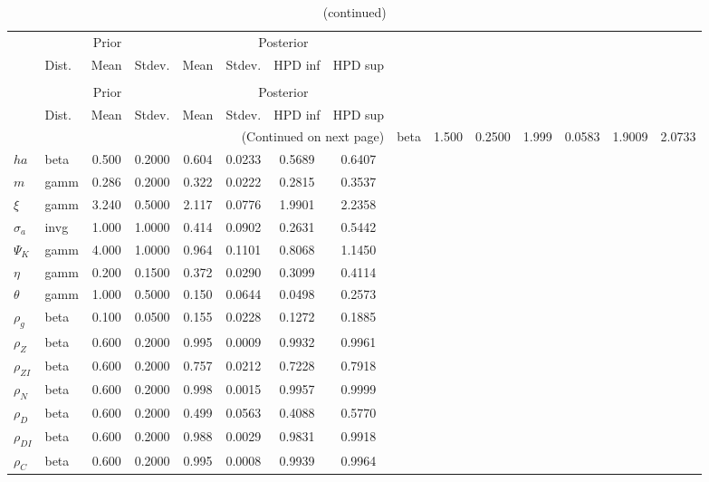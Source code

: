  
\begin{center}
\begin{longtable}{llcccccc} 
\caption{Results from Metropolis-Hastings (parameters)}
 \label{Table:MHPosterior:1}\\
\toprule 
  & \multicolumn{3}{c}{Prior}  &  \multicolumn{4}{c}{Posterior} \\
  \cmidrule(r{.75em}){2-4} \cmidrule(r{.75em}){5-8}
  & Dist. & Mean  & Stdev. & Mean & Stdev. & HPD inf & HPD sup\\
\midrule \endfirsthead 
\caption{(continued)}\\\toprule 
  & \multicolumn{3}{c}{Prior}  &  \multicolumn{4}{c}{Posterior} \\
  \cmidrule(r{.75em}){2-4} \cmidrule(r{.75em}){5-8}
  & Dist. & Mean  & Stdev. & Mean & Stdev. & HPD inf & HPD sup\\
\midrule \endhead 
\bottomrule \multicolumn{8}{r}{(Continued on next page)} \endfoot 
\bottomrule \endlastfoot 
${\gamma}$ & beta &   1.500 & 0.2500 &   1.999& 0.0583 &  1.9009 &  2.0733 \\ 
${ha}$ & beta &   0.500 & 0.2000 &   0.604& 0.0233 &  0.5689 &  0.6407 \\ 
${m}$ & gamm &   0.286 & 0.2000 &   0.322& 0.0222 &  0.2815 &  0.3537 \\ 
$\xi$ & gamm &   3.240 & 0.5000 &   2.117& 0.0776 &  1.9901 &  2.2358 \\ 
${\sigma_a}$ & invg &   1.000 & 1.0000 &   0.414& 0.0902 &  0.2631 &  0.5442 \\ 
${\Psi_K}$ & gamm &   4.000 & 1.0000 &   0.964& 0.1101 &  0.8068 &  1.1450 \\ 
${\eta}$ & gamm &   0.200 & 0.1500 &   0.372& 0.0290 &  0.3099 &  0.4114 \\ 
${\theta}$ & gamm &   1.000 & 0.5000 &   0.150& 0.0644 &  0.0498 &  0.2573 \\ 
${\rho_g}$ & beta &   0.100 & 0.0500 &   0.155& 0.0228 &  0.1272 &  0.1885 \\ 
${\rho_Z}$ & beta &   0.600 & 0.2000 &   0.995& 0.0009 &  0.9932 &  0.9961 \\ 
${\rho_{ZI}}$ & beta &   0.600 & 0.2000 &   0.757& 0.0212 &  0.7228 &  0.7918 \\ 
${\rho_N}$ & beta &   0.600 & 0.2000 &   0.998& 0.0015 &  0.9957 &  0.9999 \\ 
${\rho_D}$ & beta &   0.600 & 0.2000 &   0.499& 0.0563 &  0.4088 &  0.5770 \\ 
${\rho_{DI}}$ & beta &   0.600 & 0.2000 &   0.988& 0.0029 &  0.9831 &  0.9918 \\ 
${\rho_C}$ & beta &   0.600 & 0.2000 &   0.995& 0.0008 &  0.9939 &  0.9964 \\ 
\end{longtable}
 \end{center}
